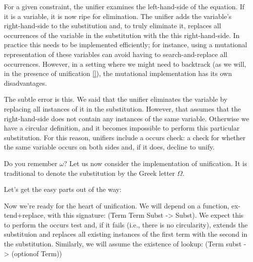 For a given constraint, the unifier examines the left-hand-side of the equation.
If it is a variable, it is now ripe for elimination. The unifier adds the
variable’s right-hand-side to the substitution and, to truly eliminate it,
replaces all occurrences of the variable in the substitution with the this
right-hand-side. In practice this needs to be implemented efficiently; for
instance, using a mutational representation of these variables can avoid having
to search-and-replace all occurrences. However, in a setting where we might need
to backtrack (as we will, in the presence of unification \ref{}), the mutational
implementation has its own disadvantages.


The subtle error is this. We said that the unifier eliminates the variable by
replacing all instances of it in the substitution. However, that assumes that
the right-hand-side does not contain any instances of the same variable.
Otherwise we have a circular definition, and it becomes impossible to perform
this particular substitution. For this reason, unifiers include a occurs check:
a check for whether the same variable occurs on both sides and, if it does,
decline to unify.


Do you remember $\omega$? Let us now consider the implementation of unification.
It is traditional to denote the substitution by the Greek letter $\Omega$.

Let’s get the easy parts out of the way:

Now we’re ready for the heart of unification. We will depend on a function, ex-
tend+replace, with this signature: (Term Term Subst -> Subst). We expect this to
perform the occurs test and, if it fails (i.e., there is no circularity),
extends the substituion and replaces all existing instances of the first term
with the second in the substitution. Similarly, we will assume the existence of
lookup: (Term subst -> (optionof Term))


